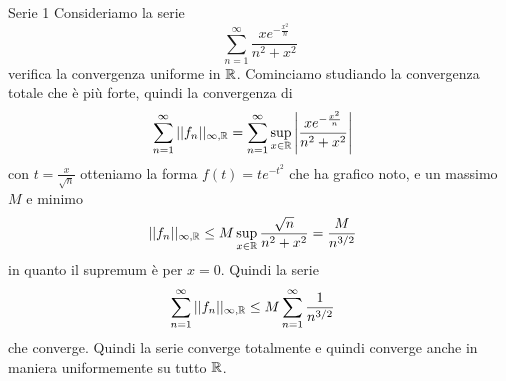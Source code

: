 \documentclass[a4paper]{article}
\begin{document}
\pagebreak

\begin{snippetexercise}{Serie 1}
    Consideriamo la serie
    \[
        \sum_{n=1}^\infty \frac{xe^{-\frac{x^2}{n}}}{n^2 + x^2}
    \]
    verifica la convergenza uniforme in \(\mathbb{R}\). Cominciamo studiando la convergenza totale
    che è più forte, quindi la convergenza di
    \begin{align*}
        \sum_{n=1}^\infty ||f_n||_{\infty, \mathbb{R}}
        &= \sum_{n=1}^\infty \sup_{x\in\mathbb{R}}
        \left|
            \frac{xe^{-\frac{x^2}{n}}}{n^2 + x^2}
        \right|
    \end{align*}
    con \(t = \frac{x}{\sqrt{n}}\) otteniamo la forma \(f(t)=te^{-t^2}\) che ha grafico noto,
    e un massimo \(M\) e minimo
    \begin{align*}
         ||f_n||_{\infty, \mathbb{R}}
        &\leq M \sup_{x\in\mathbb{R}}
        \frac{\sqrt{n}}{n^2 + x^2}
        = \frac{M}{n^{3/2}}
    \end{align*}
    in quanto il supremum è per \(x=0\). Quindi la serie
    \begin{align*}
        \sum_{n=1}^\infty ||f_n||_{\infty, \mathbb{R}}
        &\leq M \sum_{n=1}^\infty \frac{1}{n^{3/2}}
    \end{align*}
    che converge. Quindi la serie converge totalmente e quindi converge anche in maniera
    uniformemente su tutto \(\mathbb{R}\).
\end{snippetexercise}
\end{document}
